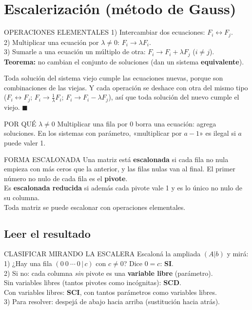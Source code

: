 \section{Escalerización (método de Gauss)}
\begin{sello}{OPERACIONES ELEMENTALES}
1) Intercambiar dos ecuaciones: $F_i\leftrightarrow F_j$.\\
2) Multiplicar una ecuación por $\lambda\neq0$: $F_i\to\lambda F_i$.\\
3) Sumarle a una ecuación un múltiplo de otra: $F_i\to F_i+\lambda F_j$ ($i\neq j$).\\[2pt]
\textbf{Teorema:} no cambian el conjunto de soluciones (dan un sistema \textbf{equivalente}).
\end{sello}
\begin{demo}
Toda solución del sistema viejo cumple las ecuaciones nuevas, porque son combinaciones de las viejas. Y cada operación se deshace con otra del mismo tipo ($F_i\leftrightarrow F_j$; $F_i\to\frac1\lambda F_i$; $F_i\to F_i-\lambda F_j$), así que toda solución del nuevo cumple el viejo. $\blacksquare$
\end{demo}
\begin{trampa}{POR QUÉ $\lambda\neq0$}
Multiplicar una fila por $0$ borra una ecuación: agrega soluciones. En los sistemas con parámetro, «multiplicar por $a-1$» es ilegal si $a$ puede valer 1.
\end{trampa}
\begin{sello}{FORMA ESCALONADA}
Una matriz está \textbf{escalonada} si cada fila no nula empieza con más ceros que la anterior, y las filas nulas van al final. El primer número no nulo de cada fila es el \textbf{pivote}.\\[2pt]
Es \textbf{escalonada reducida} si además cada pivote vale 1 y es lo único no nulo de su columna.\\[2pt]
Toda matriz se puede escalonar con operaciones elementales.
\end{sello}

\subsection*{Leer el resultado}
\begin{metodo}{CLASIFICAR MIRANDO LA ESCALERA}
Escaloná la ampliada $(A|b)$ y mirá:\\
1) ¿Hay una fila $(0\ 0\ \cdots\ 0\,|\,c)$ con $c\neq0$? Dice $0=c$: \textbf{SI}.\\
2) Si no: cada columna \emph{sin} pivote es una \textbf{variable libre} (parámetro).\\
\quad Sin variables libres (tantos pivotes como incógnitas): \textbf{SCD}.\\
\quad Con variables libres: \textbf{SCI}, con tantos parámetros como variables libres.\\
3) Para resolver: despejá de abajo hacia arriba (sustitución hacia atrás).
\end{metodo}

